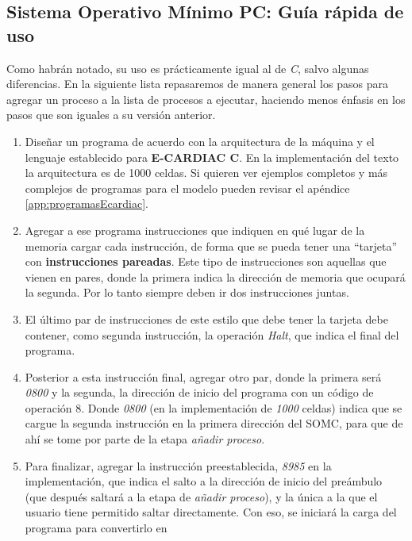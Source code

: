 \documentclass[letterpaper,12pt,oneside]{book}
\begin{document}
		\clearpage	 	
	 	
	 	\subsection{Sistema Operativo Mínimo PC: Guía rápida de uso}
			
			Como habrán notado, su uso es prácticamente igual al de \textit{C},
			salvo algunas diferencias. En la siguiente lista repasaremos de manera general
			los pasos para agregar un proceso a la lista de procesos a ejecutar, haciendo menos énfasis en los pasos que son iguales a su versión anterior.			
			\begin{enumerate}

				\item Diseñar un programa de acuerdo con la arquitectura de la máquina y el lenguaje establecido para \textbf{E-CARDIAC C}. En
				la implementación del texto la arquitectura es de 1000 celdas. Si quieren ver ejemplos completos y más
				complejos de programas para
				el modelo pueden revisar el apéndice \ref{app:programasEcardiac}.
				\item Agregar a ese programa instrucciones que indiquen en qué lugar de la memoria cargar cada instrucción, de forma que se pueda tener
				una ``tarjeta'' con \textbf{instrucciones pareadas}. Este tipo de instrucciones son aquellas que vienen en pares, donde 
				la primera indica la dirección de memoria que ocupará la segunda. Por lo tanto siempre deben ir dos instrucciones juntas.
				\item El último par de instrucciones de este estilo que debe tener la tarjeta debe contener, como segunda instrucción,
				la operación \textit{Halt}, que indica el final del programa.
				\item Posterior a esta instrucción final, agregar otro par, donde la primera será \textit{0800} y la segunda, la dirección de inicio del
				programa con un código de operación 8. Donde \textit{0800} (en
				la implementación de \textit{1000} celdas) indica que se cargue la segunda instrucción 
				en la primera dirección del SOMC, para que de ahí se tome por parte de la etapa \textit{añadir proceso}.
				\item Para finalizar, agregar la instrucción preestablecida, \textit{8985} en la implementación, que indica el salto a la dirección de 
				inicio del preámbulo (que después saltará a la etapa de \textit{añadir proceso}), y
				la única a la que el usuario tiene permitido saltar directamente. Con eso, se iniciará la carga del programa para convertirlo en

\end{enumerate}
\end{document}
